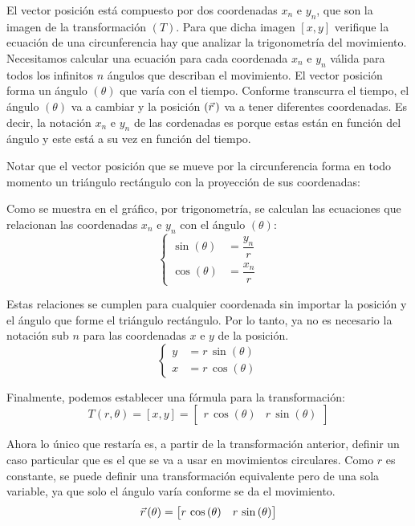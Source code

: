 \documentclass[a5paper,12pt,twoside]{book}
\begin{document}
El vector posición está compuesto por dos coordenadas $x_n$ e $y_n$, que son la imagen de la transformación $(T)$. Para que dicha imagen $[x,y]$ verifique la ecuación de una circunferencia hay que analizar la trigonometría del movimiento. Necesitamos calcular una ecuación para cada coordenada $x_n$ e $y_n$ válida para todos los infinitos $n$ ángulos que describan el movimiento. El vector posición forma un ángulo $(\theta)$ que varía con el tiempo. Conforme transcurra el tiempo, el ángulo $(\theta)$ va a cambiar y la posición $(\vec{r}\hspace{0.05cm})$ va a tener diferentes coordenadas. Es decir, la notación $x_n$ e $y_n$ de las cordenadas es porque estas están en función del ángulo y este está a su vez en función del tiempo.

Notar que el vector posición que se mueve por la circunferencia forma en todo momento un triángulo rectángulo con la proyección de sus coordenadas:

\begin{center}
    \def\svgwidth{0.4\linewidth}
    
\end{center}

Como se muestra en el gráfico, por trigonometría, se calculan las ecuaciones que relacionan las coordenadas $x_n$ e $y_n$ con el ángulo $(\theta)$:
\[
  \left\{
    \begin{aligned}
      \sin{(\theta)} &= \dfrac{y_n}{r}
      \\[1ex]
      \cos{(\theta)} &= \dfrac{x_n}{r}
    \end{aligned}
  \right.
\]

Estas relaciones se cumplen para cualquier coordenada sin importar la posición y el ángulo que forme el triángulo rectángulo. Por lo tanto, ya no es necesario la notación sub $n$ para las coordenadas $x$ e $y$ de la posición.
\[
  \left\{
    \begin{aligned}
      y &= r \, \sin{(\theta)}
      \\
      x &= r \, \cos{(\theta)}
    \end{aligned}
  \right.
\]

Finalmente, podemos establecer una fórmula para la transformación:
\[
  T(r, \theta) = [x,y] =
  \begin{bmatrix}
      r \, \cos{(\theta)} & r \, \sin{(\theta)}
  \end{bmatrix}
\]

Ahora lo único que restaría es, a partir de la transformación anterior, definir un caso particular que es el que se va a usar en movimientos circulares. Como $r$ es constante, se puede definir una transformación equivalente pero de una sola variable, ya que solo el ángulo varía conforme se da el movimiento.
\[ \vec{r}\hspace{0.05cm}(\theta) = \begin{bmatrix} r \, \cos{(\theta)} & r \, \sin{(\theta)} \end{bmatrix} \]
\end{document}
